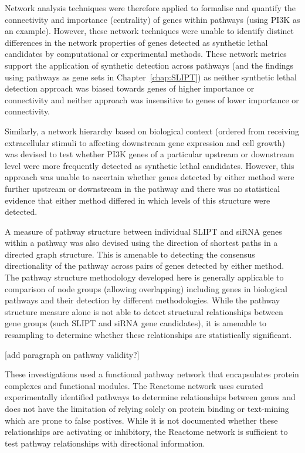 Network analysis techniques were therefore applied to formalise and quantify the connectivity and importance (centrality) of genes within pathways (using PI3K as an example). However, these network techniques were unable to identify distinct differences in the network properties of genes detected as synthetic lethal candidates by computational or experimental methods. These network metrics support the application of synthetic detection across pathways (and the findings using pathways as gene sets in Chapter~\ref{chap:SLIPT}) as neither synthetic lethal detection approach was biased towards genes of higher importance or connectivity and neither approach was insensitive to genes of lower  importance or connectivity.

Similarly, a network hierarchy based on biological context (ordered from receiving extracellular stimuli to affecting downstream gene expression and cell growth) was devised to test whether PI3K genes of a particular upstream or downstream level were more frequently detected as synthetic lethal candidates. However, this approach was unable to ascertain whether genes detected by either method were further upstream or downstream in the pathway and there was no statistical evidence that either method differed in which levels of this structure were detected.

A measure of pathway structure between individual \gls{SLIPT} and \gls{siRNA} genes within a pathway was also devised using the direction of shortest paths in a directed graph structure. This is amenable to detecting the consensus directionality of the pathway across pairs of genes detected by either method. The pathway structure methodology developed here is generally applicable to comparison of node groups (allowing overlapping) including genes in biological pathways and their detection by different methodologies. While the pathway structure measure alone is not able to detect structural relationships between gene groups (such \gls{SLIPT} and \gls{siRNA} gene candidates), it is amenable to resampling to determine whether these relationships are statistically significant.

[add paragraph on pathway validity?]

These investigations used a functional pathway network that encapsulates protein complexes and functional modules. The Reactome network \citep{Reactome} uses curated experimentally identified pathways to determine relationships between genes and does not have the limitation of relying solely on protein binding or text-mining which are prone to false postives. While it is not documented whether these relationships are activating or inhibitory, the Reactome network \citep{Reactome} is sufficient to test pathway relationships with directional information.

